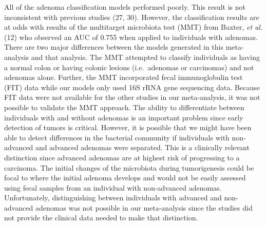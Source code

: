 \documentclass[12pt,]{article}
\begin{document}
All of the adenoma classification models performed poorly. This result
is not inconsistent with previous studies (27, 30). However, the
classification results are at odds with results of the multitarget
microbiota test (MMT) from Baxter, \emph{et al.} (12) who observed an
AUC of 0.755 when applied to individuals with adenomas. There are two
major differences between the models generated in this meta-analysis and
that analysis. The MMT attempted to classify individuals as having a
normal colon or having colonic lesions (i.e.~adenomas or carcinomas) and
not adenomas alone. Further, the MMT incorporated fecal immunoglobulin
test (FIT) data while our models only used 16S rRNA gene sequencing
data. Because FIT data were not available for the other studies in our
meta-analysis, it was not possible to validate the MMT approach. The
ability to differentiate between individuals with and without adenomas
is an important problem since early detection of tumors is critical.
However, it is possible that we might have been able to detect
differences in the bacterial community if individuals with non-advanced
and advanced adenomas were separated. This is a clinically relevant
distinction since advanced adenomas are at highest risk of progressing
to a carcinoma. The initial changes of the microbiota during
tumorigenesis could be focal to where the initial adenoma develops and
would not be easily assessed using fecal samples from an individual with
non-advanced adenomas. Unfortunately, distinguishing between individuals
with advanced and non-advanced adenomas was not possible in our
meta-analysis since the studies did not provide the clinical data needed
to make that distinction.
\end{document}
